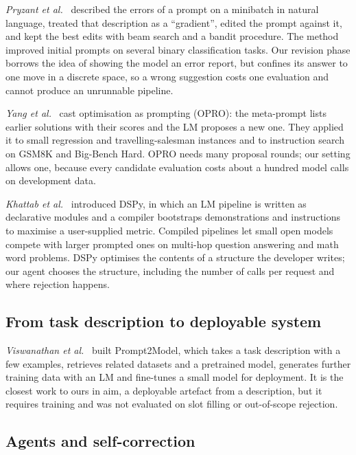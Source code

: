 \documentclass[conference]{IEEEtran}
\begin{document}
\emph{Pryzant et al.}~\cite{pryzant2023automatic} described the errors of a prompt on a minibatch in natural language, treated that description as a ``gradient'', edited the prompt against it, and kept the best edits with beam search and a bandit procedure. The method improved initial prompts on several binary classification tasks. Our revision phase borrows the idea of showing the model an error report, but confines its answer to one move in a discrete space, so a wrong suggestion costs one evaluation and cannot produce an unrunnable pipeline.

\emph{Yang et al.}~\cite{yang2024large} cast optimisation as prompting (OPRO): the meta-prompt lists earlier solutions with their scores and the LM proposes a new one. They applied it to small regression and travelling-salesman instances and to instruction search on GSM8K and Big-Bench Hard. OPRO needs many proposal rounds; our setting allows one, because every candidate evaluation costs about a hundred model calls on development data.

\emph{Khattab et al.}~\cite{khattab2024dspy} introduced DSPy, in which an LM pipeline is written as declarative modules and a compiler bootstraps demonstrations and instructions to maximise a user-supplied metric. Compiled pipelines let small open models compete with larger prompted ones on multi-hop question answering and math word problems. DSPy optimises the contents of a structure the developer writes; our agent chooses the structure, including the number of calls per request and where rejection happens.

\subsection{From task description to deployable system}

\emph{Viswanathan et al.}~\cite{viswanathan2023prompt2model} built Prompt2Model, which takes a task description with a few examples, retrieves related datasets and a pretrained model, generates further training data with an LM and fine-tunes a small model for deployment. It is the closest work to ours in aim, a deployable artefact from a description, but it requires training and was not evaluated on slot filling or out-of-scope rejection.

\subsection{Agents and self-correction}
\end{document}
